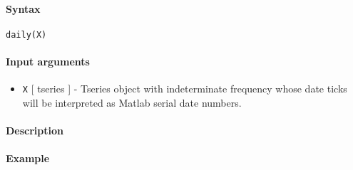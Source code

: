 


	\paragraph{Syntax}

\begin{verbatim}
daily(X)
\end{verbatim}

\paragraph{Input arguments}

\begin{itemize}
\itemsep1pt\parskip0pt
\item
  \texttt{X} {[} tseries {]} - Tseries object with indeterminate
  frequency whose date ticks will be interpreted as Matlab serial date
  numbers.
\end{itemize}

\paragraph{Description}

\paragraph{Example}


